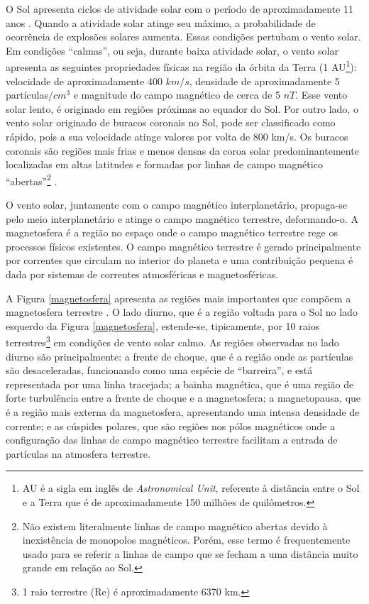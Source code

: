O Sol apresenta ciclos de atividade solar com o período de aproximadamente 11 anos \cite{kivelson1995, costa2011}. Quando a atividade solar atinge seu máximo, a probabilidade de ocorrência de explosões solares aumenta. Essas condições pertubam o vento solar. Em condições ``calmas'', ou seja, durante baixa atividade solar, o vento solar apresenta as seguintes propriedades físicas na região da órbita da Terra (1 AU\footnote{AU é a sigla em inglês de \textit{Astronomical Unit}, referente à distância entre o Sol e a Terra que é de aproximadamente 150 milhões de quilômetros.}): velocidade de aproximadamente 400 $km/s$, densidade de aproximadamente 5 partículas$/cm^3$ e magnitude do campo magnético de cerca de 5 $nT$. Esse vento solar lento, é originado em regiões próximas ao equador do Sol. Por outro lado, o vento solar originado de buracos coronais no Sol, pode ser classificado como rápido, pois a sua velocidade atinge valores por volta de 800 km/s. Os buracos coronais são regiões mais frias e menos densas da coroa solar predominantemente localizadas em altas latitudes e formadas por linhas de campo magnético ``abertas''\footnote{Não existem literalmente linhas de campo magnético abertas devido à inexistência de monopolos magnéticos. Porém, esse termo é frequentemente usado para se referir a linhas de campo que se fecham a uma distância muito grande em relação ao Sol.} \cite{russell2001}.

O vento solar, juntamente com o campo magnético interplanetário, propaga-se pelo meio interplanetário e atinge o campo magnético terrestre, deformando-o. A magnetosfera é a região no espaço onde o campo magnético terrestre rege os processos físicos existentes. O campo magnético terrestre é gerado principalmente por correntes que circulam no interior do planeta e uma contribuição pequena é dada por sistemas de correntes atmosféricas e magnetosféricas.  

A Figura \ref{magnetosfera} apresenta as regiões mais importantes que compõem a magnetosfera terrestre \cite{russell2001,sibeck2014,ezequiel2006}. O lado diurno, que é a região voltada para o Sol no lado esquerdo da Figura \ref{magnetosfera}, estende-se, tipicamente, por 10 raios terrestres\footnote{1 raio terrestre (Re) é aproximadamente 6370 km.} em condições de vento solar calmo. As regiões observadas no lado diurno são principalmente: a frente de choque, que é a região onde as partículas são desaceleradas, funcionando como uma espécie de ``barreira'', e está representada por uma linha tracejada; a bainha magnética, que é uma região de forte turbulência entre a frente de choque e a magnetosfera; a magnetopausa, que é a região mais externa da magnetosfera, apresentando uma intensa densidade de corrente; e as cúspides polares, que são regiões nos pólos magnéticos onde a configuração das linhas de campo magnético terrestre facilitam a entrada de partículas na atmosfera terrestre.

